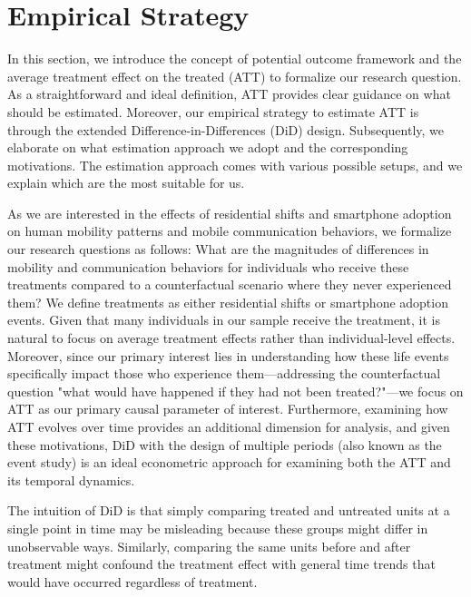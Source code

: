 \clearpage\newpage
\section{Empirical Strategy}
In this section, we introduce the concept of potential outcome framework and the average treatment effect on the treated (ATT) to formalize our research question.
As a straightforward and ideal definition, ATT provides clear guidance on what should be estimated.
Moreover, our empirical strategy to estimate ATT is through the extended Difference-in-Differences (DiD) design.
Subsequently, we elaborate on what estimation approach we adopt and the corresponding motivations.
The estimation approach comes with various possible setups, and we explain which are the most suitable for us.


As we are interested in the effects of residential shifts and smartphone adoption on human mobility patterns and mobile communication behaviors, we formalize our research questions as follows: What are the magnitudes of differences in mobility and communication behaviors for individuals who receive these treatments compared to a counterfactual scenario where they never experienced them?
We define treatments as either residential shifts or smartphone adoption events. Given that many individuals in our sample receive the treatment, it is natural to focus on average treatment effects rather than individual-level effects. Moreover, since our primary interest lies in understanding how these life events specifically impact those who experience them---addressing the counterfactual question "what would have happened if they had not been treated?"---we focus on ATT as our primary causal parameter of interest.
Furthermore, examining how ATT evolves over time provides an additional dimension for analysis, and given these motivations, DiD with the design of multiple periods (also known as the event study) is an ideal econometric approach for examining both the ATT and its temporal dynamics.


The intuition of DiD is that simply comparing treated and untreated units at a single point in time may be misleading because these groups might differ in unobservable ways. Similarly, comparing the same units before and after treatment might confound the treatment effect with general time trends that would have occurred regardless of treatment.

